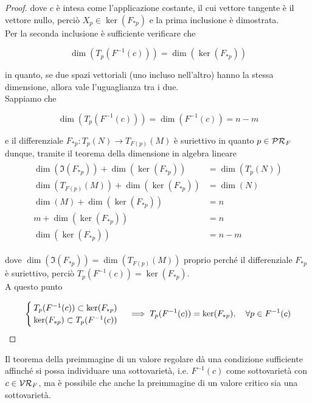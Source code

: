 \begin{proof}
	dove $ c $ è intesa come l'applicazione costante, il cui vettore tangente è il vettore nullo, perciò $ X_{p} \in \ker(F_{*p}) $ e la prima inclusione è dimostrata. \\
	Per la seconda inclusione è sufficiente verificare che
	
	\begin{equation}
		\dim(T_{p}(F^{-1}(c))) = \dim(\ker(F_{*p}))
	\end{equation}

	in quanto, se due spazi vettoriali (uno incluso nell'altro) hanno la stessa dimensione, allora vale l'uguaglianza tra i due. \\
	Sappiamo che
	
	\begin{equation}
		\dim(T_{p}(F^{-1}(c))) = \dim(F^{-1}(c)) = n-m
	\end{equation}

	e il differenziale $ F_{*p} : T_{p}(N) \to T_{F(p)}(M) $ è suriettivo in quanto $ p \in \mathcal{PR}_{F} $ dunque, tramite il teorema della dimensione in algebra lineare
	\begin{align}
		\begin{split}
			\dim(\Im(F_{*p})) + \dim(\ker(F_{*p})) &= \dim(T_{p}(N)) \\
			\dim(T_{F(p)}(M)) + \dim(\ker(F_{*p})) &= \dim(N) \\
			\dim(M) + \dim(\ker(F_{*p})) &= n \\
			m + \dim(\ker(F_{*p})) &= n \\
			\dim(\ker(F_{*p})) &= n-m
		\end{split}		
	\end{align}

	dove $ \dim(\Im(F_{*p})) = \dim(T_{F(p)}(M)) $ proprio perché il differenziale $ F_{*p} $ è suriettivo, perciò $ T_{p}(F^{-1}(c)) = \ker(F_{*p}) $. \\
	A questo punto
	
	\begin{equation}
		\begin{cases}
			T_{p}(F^{-1}(c)) \subset \ker(F_{*p}) \\
			\ker(F_{*p}) \subset T_{p}(F^{-1}(c))
		\end{cases}%
		\implies %
		T_{p}(F^{-1}(c)) = \ker(F_{*p}) \qcomma \forall p \in F^{-1}(c)
	\end{equation}
\end{proof}

\begin{remark}
	Il teorema della preimmagine di un valore regolare dà una condizione sufficiente affinché si possa individuare una sottovarietà, i.e. $ F^{-1}(c) $ come sottovarietà con $ c \in \mathcal{VR}_{F} $, ma è possibile che anche la preimmagine di un valore critico sia una sottovarietà.
\end{remark}

